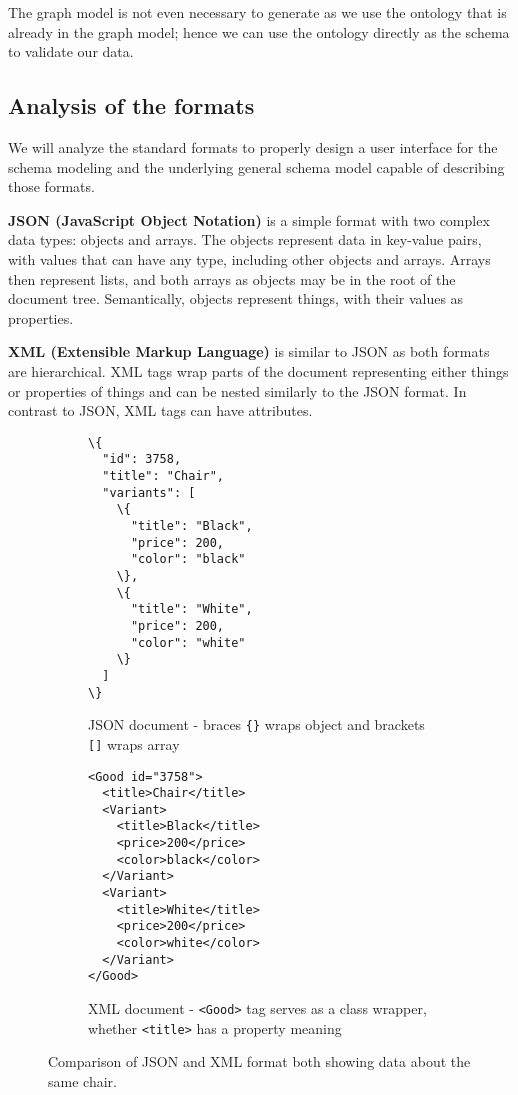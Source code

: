 The graph model is not even necessary to generate as we use the ontology that is already in the graph model; hence we can use the ontology directly as the schema to validate our data.


\subsection*{Analysis of the formats}

We will analyze the standard formats to properly design a user interface for the schema modeling and the underlying general schema model capable of describing those formats.

\smallskip

\textbf{JSON (JavaScript Object Notation)} is a simple format with two complex data types: objects and arrays. The objects represent data in key-value pairs, with values that can have any type, including other objects and arrays. Arrays then represent lists, and both arrays as objects may be in the root of the document tree. Semantically, objects represent things, with their values as properties.

\textbf{XML (Extensible Markup Language)} is similar to JSON as both formats are hierarchical. XML tags wrap parts of the document representing either things or properties of things and can be nested similarly to the JSON format. In contrast to JSON, XML tags can have attributes.

\begin{figure}[h!]\centering
    \begin{subfigure}[b]{.45\textwidth}
\begin{Verbatim}[commandchars=\\\{\}]
\{
  "id": 3758,
  "title": "Chair",
  "variants": [
    \{
      "title": "Black",
      "price": 200,
      "color": "black"
    \},
    \{
      "title": "White",
      "price": 200,
      "color": "white"
    \}
  ]
\}
\end{Verbatim}
        \caption{JSON document - braces {\tt\{\}} wraps object and brackets {\tt[]} wraps array}
      \end{subfigure}\hfil%
      \begin{subfigure}[b]{.45\textwidth}
\begin{Verbatim}[commandchars=\\\{\}]
<Good id="3758">
  <title>Chair</title>
  <Variant>
    <title>Black</title>
    <price>200</price>
    <color>black</color>
  </Variant>
  <Variant>
    <title>White</title>
    <price>200</price>
    <color>white</color>
  </Variant>
</Good>
\end{Verbatim}

\vfill

        \caption{XML document - {\tt<Good>} tag serves as a class wrapper, whether {\tt<title>} has a property meaning}
      \end{subfigure}
    \caption{Comparison of JSON and XML format both showing data about the same chair.}
    \label{analysis/xml-json}
\end{figure}

